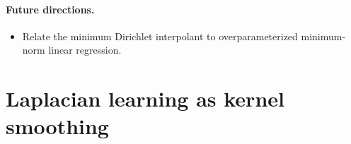 \documentclass{article}
\newcommand{\1}{\mathbf{1}}
\theoremstyle{definition}
\theoremstyle{remark}
\begin{document}
\paragraph{Future directions.}
\begin{itemize}
	\item Relate the minimum Dirichlet interpolant to overparameterized minimum-norm linear regression. 
\end{itemize}



\section{Laplacian learning as kernel smoothing}
\end{document}
